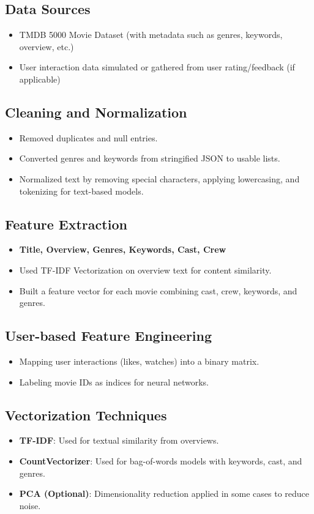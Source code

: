 \documentclass[a4paper]{article}
\theoremstyle{plain}
\begin{document}
\subsection{Data Sources}
\begin{itemize}
    \item TMDB 5000 Movie Dataset (with metadata such as genres, keywords, overview, etc.)
    \item User interaction data simulated or gathered from user rating/feedback (if applicable)
\end{itemize}

\subsection{Cleaning and Normalization}
\begin{itemize}
    \item Removed duplicates and null entries.
    \item Converted genres and keywords from stringified JSON to usable lists.
    \item Normalized text by removing special characters, applying lowercasing, and tokenizing for text-based models.
\end{itemize}

\subsection{Feature Extraction}
\begin{itemize}
    \item \textbf{Title, Overview, Genres, Keywords, Cast, Crew}
    \item Used TF-IDF Vectorization on overview text for content similarity.
    \item Built a feature vector for each movie combining cast, crew, keywords, and genres.
\end{itemize}

\subsection{User-based Feature Engineering}
\begin{itemize}
    \item Mapping user interactions (likes, watches) into a binary matrix.
    \item Labeling movie IDs as indices for neural networks.
\end{itemize}

\subsection{Vectorization Techniques}
\begin{itemize}
    \item \textbf{TF-IDF}: Used for textual similarity from overviews.
    \item \textbf{CountVectorizer}: Used for bag-of-words models with keywords, cast, and genres.
    \item \textbf{PCA (Optional)}: Dimensionality reduction applied in some cases to reduce noise.
\end{itemize}
\end{document}
